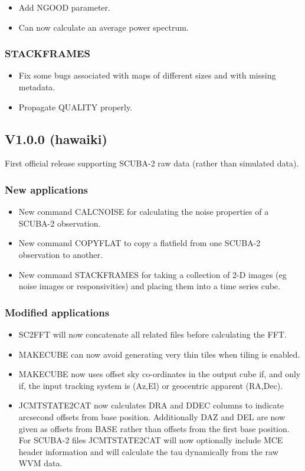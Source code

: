 \documentclass[twoside,11pt]{article}
\renewcommand{\_}{\texttt{\symbol{95}}}
\begin{document}
\begin{itemize}
\item Add NGOOD parameter.
\item Can now calculate an average power spectrum.
\end{itemize}

\subsubsection{STACKFRAMES}

\begin{itemize}
\item Fix some bugs associated with maps of different sizes and with
  missing metadata.
\item Propagate QUALITY properly.
\end{itemize}

\subsection{V1.0.0 (hawaiki)}

First official release supporting SCUBA-2 raw data (rather than simulated data).

\subsubsection*{New applications}
\begin{itemize}
\item New command CALCNOISE for calculating the noise properties of a SCUBA-2 observation.
\item New command COPYFLAT to copy a flatfield from one SCUBA-2 observation to another.
\item New command STACKFRAMES for taking a collection of 2-D images
  (eg noise images or responsivities) and placing them into a time
  series cube.
\end{itemize}

\subsubsection*{Modified applications}
\begin{itemize}
\item SC2FFT will now concatenate all related files before calculating the FFT.
\item MAKECUBE can now avoid generating very thin tiles when tiling is enabled.
\item MAKECUBE now uses offset sky co-ordinates in the output cube if,
  and only if, the input tracking system is (Az,El) or geocentric
  apparent (RA,Dec).
\item JCMTSTATE2CAT now calculates DRA and DDEC columns to indicate
  arcsecond offsets from base position. Additionally DAZ and DEL are
  now given as offsets from BASE rather than offsets from the first
  base position. For SCUBA-2 files JCMTSTATE2CAT will now optionally include
  MCE header information and will calculate the tau dynamically from the
  raw WVM data.
\end{itemize}
\end{document}
